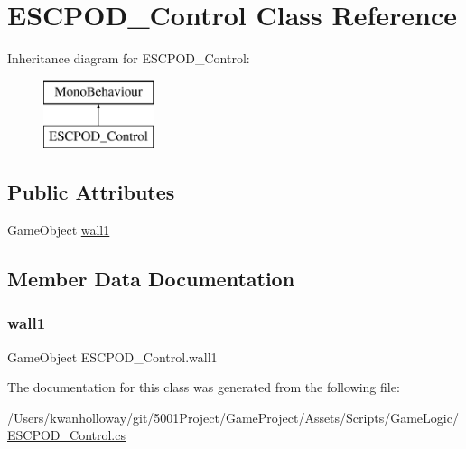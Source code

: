 \hypertarget{class_e_s_c_p_o_d___control}{}\section{E\+S\+C\+P\+O\+D\+\_\+\+Control Class Reference}
\label{class_e_s_c_p_o_d___control}
Inheritance diagram for E\+S\+C\+P\+O\+D\+\_\+\+Control\+:\begin{figure}[H]
\begin{center}
\leavevmode
\includegraphics[height=2.000000cm]{class_e_s_c_p_o_d___control}
\end{center}
\end{figure}
\subsection*{Public Attributes}
\begin{DoxyCompactItemize}
\item 
Game\+Object \hyperlink{class_e_s_c_p_o_d___control_a94e64c0ea528fb7c2691ebd0b018197a}{wall1}
\end{DoxyCompactItemize}


\subsection{Member Data Documentation}
\mbox{\label{class_e_s_c_p_o_d___control_a94e64c0ea528fb7c2691ebd0b018197a}} 
\subsubsection{\texorpdfstring{wall1}{wall1}}
{\footnotesize\ttfamily Game\+Object E\+S\+C\+P\+O\+D\+\_\+\+Control.\+wall1}



The documentation for this class was generated from the following file\+:\begin{DoxyCompactItemize}
\item 
/\+Users/kwanholloway/git/5001\+Project/\+Game\+Project/\+Assets/\+Scripts/\+Game\+Logic/\hyperlink{_e_s_c_p_o_d___control_8cs}{E\+S\+C\+P\+O\+D\+\_\+\+Control.\+cs}\end{DoxyCompactItemize}
